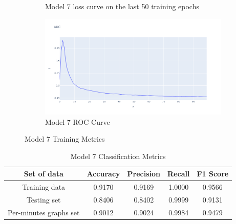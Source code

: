 \begin{figure}[H]
\begin{subfigure}{0.49\textwidth}
        \caption{Model 7 loss curve on the last 50 training epochs}
    \label{fig:do_3_ploss}
    \end{subfigure}
    \begin{subfigure}{0.49\textwidth}
        \centering
        \includegraphics[width=\linewidth]{figures/ev/do_3_auc.png}
        \caption{Model 7 ROC Curve}
    \label{fig:do_3_auc}
    \end{subfigure}
    \captionsetup{font=large}
\caption{Model 7 Training Metrics}
 \label{fig:7_tr}
\end{figure}

\begin{table}[H]%
\centering
\begin{tabular}{|c|c|c|c|c|}
\hline
Set of data & Accuracy & Precision & Recall & F1 Score \\
\hline
Training data  & 0.9170 & 0.9169 & 1.0000 & 0.9566 \\
\hline
Testing set & 0.8406 & 0.8402 & 0.9999 & 0.9131 \\
\hline
Per-minutes graphs set & 0.9012 & 0.9024 & 0.9984 & 0.9479 \\
\hline
\end{tabular}
\caption{Model 7 Classification Metrics}
\label{M7_tab}
\end{table}

